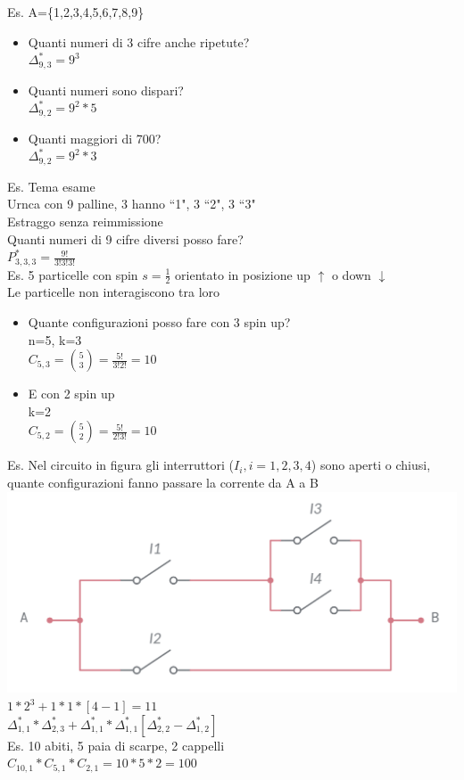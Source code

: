 \documentclass{report}
\begin{document}
\begin{itemize}
        Es. A=\{1,2,3,4,5,6,7,8,9\}
        \begin{itemize}
          \item Quanti numeri di 3 cifre anche ripetute?\\$\Delta_{9,3}^* = 9^3$
          \item Quanti numeri sono dispari?\\$\Delta_{9,2}^* = 9^2*5$
          \item Quanti maggiori di 700?\\$\Delta_{9,2}^* = 9^2*3$
        \end{itemize}
        Es. Tema esame\\
        Urnca con 9 palline, 3 hanno ``1", 3 ``2", 3 ``3"\\
        Estraggo senza reimmissione\\
        Quanti numeri di 9 cifre diversi posso fare?\\
        $P_{3,3,3}^* = \frac{9!}{3!3!3!}$\\
        Es. 5 particelle con spin $s=\frac{1}{2}$ orientato in posizione up $\uparrow$ o down $\downarrow$\\
        Le particelle non interagiscono tra loro
        \begin{itemize}
          \item Quante configurazioni posso fare con 3 spin up?\\n=5, k=3\\$C_{5,3} = \binom{5}{3}=\frac{5!}{3!2!}=10$
          \item E con 2 spin up\\k=2\\$C_{5,2} = \binom{5}{2}=\frac{5!}{2!3!}=10$
        \end{itemize}
        Es. Nel circuito in figura gli interruttori ($I_i,i=1,2,3,4$) sono aperti o chiusi, quante configurazioni fanno passare la corrente da A a B\\
        \includegraphics[scale=0.3]{img2.png}
        $1*2^3+1*1*[4-1]=11$\\
        $\Delta_{1,1}^* * \Delta_{2,3}^* + \Delta_{1,1}^* * \Delta_{1,1}^* [\Delta_{2,2}^*-\Delta_{1,2}^*]$
        \\
        Es. 10 abiti, 5 paia di scarpe, 2 cappelli\\
        $C_{10,1}*C_{5,1}*C_{2,1}=10*5*2=100$
\end{itemize}
\end{document}
